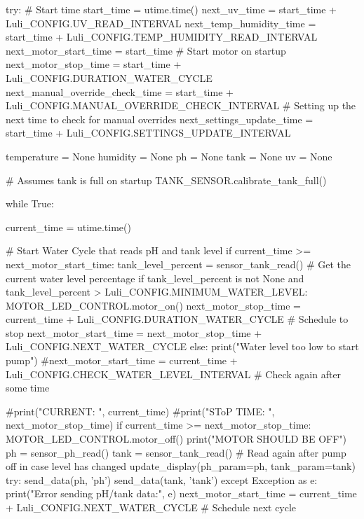 \documentclass[12pt]{article} %
\begin{document}
\begin{pythoncode}[caption={Main MicroPython Code}]
    try:
        # Start time
        start_time = utime.time()
        next_uv_time = start_time + Luli_CONFIG.UV_READ_INTERVAL
        next_temp_humidity_time = start_time + Luli_CONFIG.TEMP_HUMIDITY_READ_INTERVAL
        next_motor_start_time = start_time # Start motor on startup
        next_motor_stop_time = start_time + Luli_CONFIG.DURATION_WATER_CYCLE
        next_manual_override_check_time = start_time + Luli_CONFIG.MANUAL_OVERRIDE_CHECK_INTERVAL  # Setting up the next time to check for manual overrides
        next_settings_update_time = start_time + Luli_CONFIG.SETTINGS_UPDATE_INTERVAL
        
        temperature = None
        humidity = None
        ph = None
        tank = None
        uv = None

        # Assumes tank is full on startup
        TANK_SENSOR.calibrate_tank_full()

        while True:

            current_time = utime.time()
            
            
            # Start Water Cycle that reads pH and tank level
            if current_time >= next_motor_start_time:
                tank_level_percent = sensor_tank_read()  # Get the current water level percentage
                if tank_level_percent is not None and tank_level_percent > Luli_CONFIG.MINIMUM_WATER_LEVEL:
                    MOTOR_LED_CONTROL.motor_on()
                    next_motor_stop_time = current_time + Luli_CONFIG.DURATION_WATER_CYCLE  # Schedule to stop
                    next_motor_start_time = next_motor_stop_time + Luli_CONFIG.NEXT_WATER_CYCLE
                else:
                    print("Water level too low to start pump")
                    #next_motor_start_time = current_time + Luli_CONFIG.CHECK_WATER_LEVEL_INTERVAL  # Check again after some time
                    
            #print("CURRENT: ", current_time)
            #print("SToP TIME: ", next_motor_stop_time)
            if current_time >= next_motor_stop_time:
                MOTOR_LED_CONTROL.motor_off()
                print("MOTOR SHOULD BE OFF")
                ph = sensor_ph_read()
                tank = sensor_tank_read()  # Read again after pump off in case level has changed
                update_display(ph_param=ph, tank_param=tank)
                try:
                    send_data(ph, 'ph')
                    send_data(tank, 'tank')
                except Exception as e:
                    print("Error sending pH/tank data:", e)
                next_motor_start_time = current_time + Luli_CONFIG.NEXT_WATER_CYCLE  # Schedule next cycle


\end{pythoncode}
\end{document}
